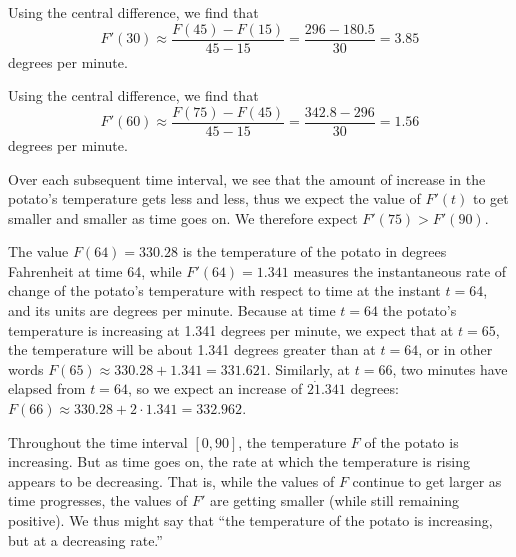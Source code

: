 \begin{activitySolution}
\ba
	\item Using the central difference, we find that 
	$$F'(30) \approx \frac{F(45)-F(15)}{45-15} = \frac{296-180.5}{30} = 3.85$$
	degrees per minute.
	\item Using the central difference, we find that 
	$$F'(60) \approx \frac{F(75)-F(45)}{45-15} = \frac{342.8-296}{30} = 1.56$$
	degrees per minute.
	\item Over each subsequent time interval, we see that the amount of increase in the potato's temperature gets less and less, thus we expect the value of $F'(t)$ to get smaller and smaller as time goes on.  We therefore expect $F'(75) > F'(90)$.
	\item The value $F(64) = 330.28$ is the temperature of the potato in degrees Fahrenheit at time 64, while $F'(64) = 1.341$ measures the instantaneous rate of change of the potato's temperature with respect to time at the instant $t = 64$, and its units are degrees per minute.  Because at time $t = 64$ the potato's temperature is increasing at 1.341 degrees per minute, we expect that at $t = 65$, the temperature will be about 1.341 degrees greater than at $t = 64$, or in other words $F(65) \approx 330.28 + 1.341 = 331.621$.  Similarly, at $t = 66$, two minutes have elapsed from $t = 64$, so we expect an increase of $2 \dot 1.341$ degrees:  $F(66) \approx 330.28 + 2 \cdot 1.341 = 332.962$. 
	\item Throughout the time interval $[0,90]$, the temperature $F$ of the potato is increasing.  But as time goes on, the rate at which the temperature is rising appears to be decreasing.  That is, while the values of $F$ continue to get larger as time progresses, the values of $F'$ are getting smaller (while still remaining positive). We thus might say that ``the temperature of the potato is increasing, but at a decreasing rate.''
\ea
\end{activitySolution}
\aftera